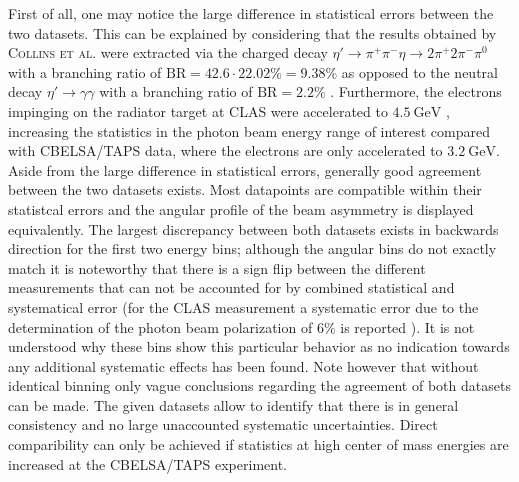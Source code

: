 First of all, one may notice the large difference in statistical errors between the two datasets. This can be explained by considering that the results obtained by \textsc{Collins et al.} \cite{collins} were extracted via the charged decay $\eta'\to\pi^+\pi^-\eta\to2\pi^+2\pi^-\pi^0$ with a branching ratio of $\text{BR}=42.6\cdot22.02\%=9.38\%$ \cite{pdg} as opposed to the neutral decay $\eta'\to\gamma\gamma$ with a branching ratio of $\text{BR}=2.2\%$ \cite{pdg}. Furthermore, the electrons impinging on the radiator target at CLAS were accelerated to  $\SI{4.5}{\giga\eV}$ \cite{collins}, increasing the statistics in the photon beam energy range of interest compared with CBELSA/TAPS data, where the electrons are only accelerated to  $\SI{3.2}{\giga\eV}$. Aside from the large difference in statistical errors, generally good agreement between the two datasets exists. Most datapoints are compatible within their statistcal errors and the angular profile of the beam asymmetry is displayed equivalently. The largest discrepancy between both datasets exists in backwards direction for the first two energy bins;  although the angular bins do not exactly match it is noteworthy that there is a sign flip between the different measurements that can not be accounted for by combined statistical and systematical error (for the CLAS measurement a systematic error due to the determination of the photon beam polarization of $6\%$ is reported \cite{collins}). It is not understood why these bins show this particular behavior as no indication towards any additional systematic effects has been found. Note however that without identical binning only vague conclusions regarding the agreement of both datasets can be made. The given datasets allow to identify that there is in general consistency and no large unaccounted systematic uncertainties. Direct comparibility can only be achieved if statistics at high center of mass energies are increased at the CBELSA/TAPS experiment. 

